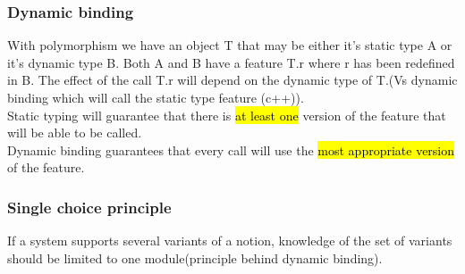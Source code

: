 \documentclass[11pt]{article}
\begin{document}
\subsubsection{Dynamic binding}
With polymorphism we have an object T that may be either it's static type A or it's dynamic type B. Both A and B have a feature T.r where r has been redefined in B. The effect of the call T.r will depend on the dynamic type of T.(Vs dynamic binding which will call the static type feature (c++)).\\Static typing will guarantee that there is \hl{at least one} version of the feature that will be able to be called.\\Dynamic binding guarantees that every call will use the \hl{most appropriate version} of the feature.
\subsubsection{Single choice principle}
If a system supports several variants of a notion, knowledge of the set of variants should be limited to one module(principle behind dynamic binding).



 




 


 




 
\end{document}
